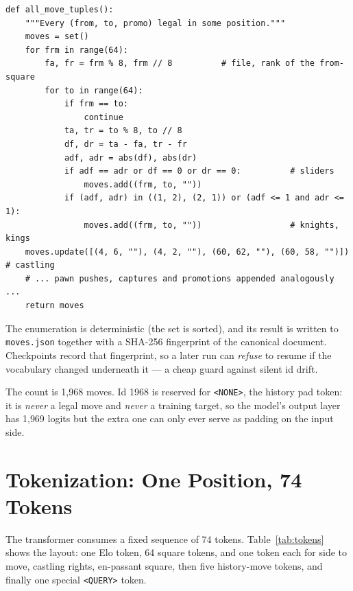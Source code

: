 \documentclass[10pt,a4paper]{article}
\newcommand{\code}[1]{\texttt{#1}}
\begin{document}
\begin{lstlisting}[style=code, caption={Move vocabulary enumeration
(\code{move\_vocab.py}, excerpt --- the pawn section is omitted). The
castling king-trips must be added explicitly: \code{e1g1} is not a
one-square king step, so the geometry filters above miss it.},
label={lst:vocab}, float=htbp]
def all_move_tuples():
    """Every (from, to, promo) legal in some position."""
    moves = set()
    for frm in range(64):
        fa, fr = frm % 8, frm // 8          # file, rank of the from-square
        for to in range(64):
            if frm == to:
                continue
            ta, tr = to % 8, to // 8
            df, dr = ta - fa, tr - fr
            adf, adr = abs(df), abs(dr)
            if adf == adr or df == 0 or dr == 0:          # sliders
                moves.add((frm, to, ""))
            if (adf, adr) in ((1, 2), (2, 1)) or (adf <= 1 and adr <= 1):
                moves.add((frm, to, ""))                  # knights, kings
    moves.update([(4, 6, ""), (4, 2, ""), (60, 62, ""), (60, 58, "")])  # castling
    # ... pawn pushes, captures and promotions appended analogously ...
    return moves
\end{lstlisting}

The enumeration is deterministic (the set is sorted), and its result is
written to \code{moves.json} together with a SHA-256 fingerprint of the
canonical document. Checkpoints record that fingerprint, so a later run
can \emph{refuse} to resume if the vocabulary changed underneath it ---
a cheap guard against silent id drift.

The count is 1{,}968 moves. Id 1968 is reserved for \code{<NONE>}, the
history pad token: it is \emph{never} a legal move and \emph{never} a
training target, so the model's output layer has 1{,}969 logits but the
extra one can only ever serve as padding on the input side.

\section{Tokenization: One Position, 74 Tokens}\label{sec:tokenization}

The transformer consumes a fixed sequence of 74 tokens. Table~\ref{tab:tokens}
shows the layout: one Elo token, 64 square tokens, and one token each for
side to move, castling rights, en-passant square, then five history-move
tokens, and finally one special \code{<QUERY>} token.
\end{document}

